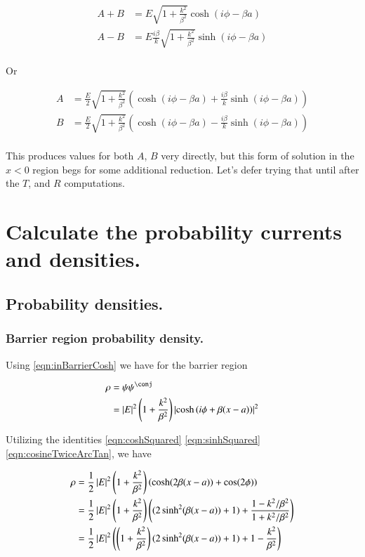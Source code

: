 \documentclass{article}
\begin{document}
\begin{align*}
A + B &= E \sqrt{1 + \frac{k^2}{\beta^2}} \cosh\left( i\phi -\beta a \right) \\
A - B &= E \frac{i\beta}{k} \sqrt{1 + \frac{k^2}{\beta^2}} \sinh\left( i\phi -\beta a \right) \\
\end{align*}

Or

\begin{align*}
A &= \frac{E}{2} \sqrt{1 + \frac{k^2}{\beta^2}} \left(
\cosh\left( i\phi -\beta a \right) + \frac{i\beta}{k} \sinh\left( i\phi -\beta a \right) 
\right) \\
B &= \frac{E}{2} \sqrt{1 + \frac{k^2}{\beta^2}} \left(
\cosh\left( i\phi -\beta a \right) - \frac{i\beta}{k} \sinh\left( i\phi -\beta a \right) 
\right) \\
\end{align*}

This produces values for both $A$, $B$ very directly, but this 
form of solution in the $x<0$ region begs for some additional reduction.  Let's
defer trying that until after the $T$, and $R$ computations.

\section{ Calculate the probability currents and densities. }

\subsection{ Probability densities. }

\subsubsection{ Barrier region probability density. }

Using \ref{eqn:inBarrierCosh} we have for the barrier region

\begin{align*}
\rho 
&= \psi\psi^\conj \\
&= \Abs{E}^2 
\left(1 + \frac{k^2}{\beta^2}\right) \Abs{\cosh\left( i\phi + \beta(x-a) \right) }^2
\end{align*}

Utilizing the identities \ref{eqn:coshSquared} \ref{eqn:sinhSquared} \ref{eqn:cosineTwiceArcTan}, we have

\begin{align*}
\rho 
&= \frac{1}{2} \left\lvert{E}\right\rvert^2 
\left(1 + \frac{k^2}{\beta^2}\right) \left( \cosh( 2 \beta(x-a)) + \cos(2\phi) \right) \\
&= \frac{1}{2} \left\lvert{E}\right\rvert^2 
\left(1 + \frac{k^2}{\beta^2}\right) \left( (2 \sinh^2( \beta(x-a)) + 1) + \frac{1 - k^2/\beta^2}{1 + k^2/\beta^2}\right) \\
&= \frac{1}{2} \left\lvert{E}\right\rvert^2 \left(
\left(1 + \frac{k^2}{\beta^2}\right) (2 \sinh^2( \beta(x-a)) + 1) + 1 - \frac{k^2}{\beta^2} \right) \\
\end{align*}
\end{document}
